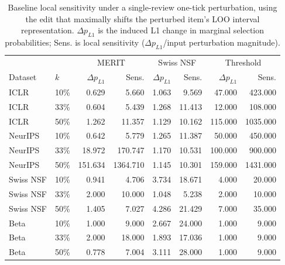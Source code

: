 \begin{table}[t]
\centering
\small
\setlength{\tabcolsep}{4pt}
\begin{tabular}{llrrrrrr}
\toprule
 & & \multicolumn{2}{c}{MERIT} & \multicolumn{2}{c}{Swiss NSF} & \multicolumn{2}{c}{Threshold} \\
Dataset & $k$ & $\Delta p_{L1}$ & Sens. & $\Delta p_{L1}$ & Sens. & $\Delta p_{L1}$ & Sens. \\
\midrule
ICLR & 10\% & 0.629 & 5.660 & 1.063 & 9.569 & 47.000 & 423.000 \\
ICLR & 33\% & 0.604 & 5.439 & 1.268 & 11.413 & 12.000 & 108.000 \\
ICLR & 50\% & 1.262 & 11.357 & 1.129 & 10.162 & 115.000 & 1035.000 \\
NeurIPS & 10\% & 0.642 & 5.779 & 1.265 & 11.387 & 50.000 & 450.000 \\
NeurIPS & 33\% & 18.972 & 170.747 & 1.170 & 10.531 & 100.000 & 900.000 \\
NeurIPS & 50\% & 151.634 & 1364.710 & 1.145 & 10.301 & 159.000 & 1431.000 \\
Swiss NSF & 10\% & 0.941 & 4.706 & 3.734 & 18.671 & 4.000 & 20.000 \\
Swiss NSF & 33\% & 2.000 & 10.000 & 1.048 & 5.238 & 2.000 & 10.000 \\
Swiss NSF & 50\% & 1.405 & 7.027 & 4.286 & 21.429 & 7.000 & 35.000 \\
Beta & 10\% & 1.000 & 9.000 & 2.667 & 24.000 & 1.000 & 9.000 \\
Beta & 33\% & 2.000 & 18.000 & 1.893 & 17.036 & 1.000 & 9.000 \\
Beta & 50\% & 0.778 & 7.004 & 3.111 & 28.000 & 1.000 & 9.000 \\
\bottomrule
\end{tabular}
\caption{Baseline local sensitivity under a single-review one-tick perturbation, using the edit that maximally shifts the perturbed item's LOO interval representation. $\Delta p_{L1}$ is the induced L1 change in marginal selection probabilities; Sens. is local sensitivity ($\Delta p_{L1}$/input perturbation magnitude).}
\label{tab:baseline_local_sensitivity}
\end{table}
